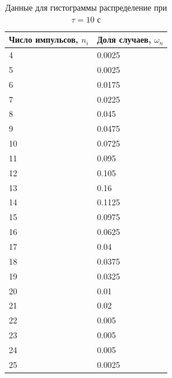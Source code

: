 \documentclass[a4paper]{article}
\begin{document}
\begin{table}[!h]
\begin{center}
\begin{tabular}{|l|l|}
\hline
Число импульсов, $n_{i}$ & Доля случаев, $\omega_{n}$ \\ \hline
4                        & 0.0025                     \\ \hline
5                        & 0.0025                     \\ \hline
6                        & 0.0175                     \\ \hline
7                        & 0.0225                     \\ \hline
8                        & 0.045                      \\ \hline
9                        & 0.0475                     \\ \hline
10                       & 0.0725                     \\ \hline
11                       & 0.095                      \\ \hline
12                       & 0.105                      \\ \hline
13                       & 0.16                       \\ \hline
14                       & 0.1125                     \\ \hline
15                       & 0.0975                     \\ \hline
16                       & 0.0625                     \\ \hline
17                       & 0.04                       \\ \hline
18                       & 0.0375                     \\ \hline
19                       & 0.0325                     \\ \hline
20                       & 0.01                       \\ \hline
21                       & 0.02                       \\ \hline
22                       & 0.005                      \\ \hline
23                       & 0.005                      \\ \hline
24                       & 0.005                      \\ \hline
25                       & 0.0025                     \\ \hline
\end{tabular}
\caption{Данные для гистограммы распределение при $\tau = 10$ с}
\end{center}
\end{table}
\end{document}
